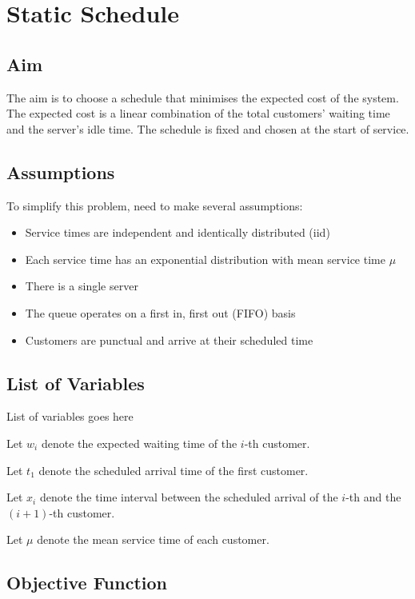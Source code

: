 \chapter{Static Schedule}

\section{Aim}

The aim is to choose a schedule that minimises the expected cost of the system. The expected cost is a linear combination of the total customers' waiting time and the server's idle time. The schedule is fixed and chosen at the start of service.

\section{Assumptions}

To simplify this problem, need to make several assumptions:

\begin{itemize}[nosep]
	\item Service times are independent and identically distributed (iid)
	\item Each service time has an exponential distribution with mean service time $\mu$
	\item There is a single server
	\item The queue operates on a first in, first out (FIFO) basis
	\item Customers are punctual and arrive at their scheduled time
\end{itemize}

\section{List of Variables}

List of variables goes here

Let $w_{i}$ denote the expected waiting time of the $i$-th customer.

Let $t_{1}$ denote the scheduled arrival time of the first customer.

Let $x_{i}$ denote the time interval between the scheduled arrival of the $i$-th and the $(i + 1)$-th customer.

Let $\mu$ denote the mean service time of each customer. 

\section{Objective Function}

